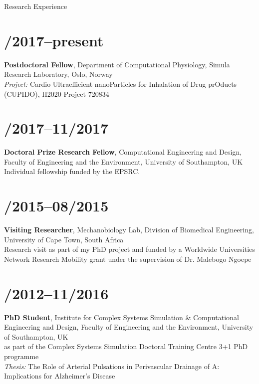 \documentclass[margin,line,10pt]{res}
\begin{document}
\begin{resume}
\vspace*{-.2in}

{\sc Research Experience}\\
\vspace*{-.35in}
\section{/2017--present}{\bf Postdoctoral Fellow}, Department of Computational Physiology, Simula Research Laboratory, Oslo, Norway\\
{\em Project:} Cardio Ultraefficient nanoParticles for Inhalation of Drug prOducts (CUPIDO), H2020 Project 720834\\
\vspace*{-.35in}
\section{/2017--11/2017}{\bf Doctoral Prize Research Fellow}, Computational Engineering and Design, Faculty of Engineering and the Environment, University of Southampton, UK\\
Individual fellowship funded by the EPSRC.\\
\vspace*{-.35in}
\section{/2015--08/2015}{\bf Visiting Researcher}, Mechanobiology Lab, Division of Biomedical Engineering, University of Cape Town, South Africa\\
Research visit as part of my PhD project and funded by a Worldwide Universities Network Research Mobility grant under the supervision of Dr. Malebogo Ngoepe\\
\vspace*{-.35in}
\section{/2012--11/2016}{\bf PhD Student}, Institute for Complex Systems Simulation \& Computational Engineering and Design, Faculty of Engineering and the Environment, University of Southampton, UK\\
as part of the Complex Systems Simulation Doctoral Training Centre 3+1 PhD programme\\
{\em Thesis:} The Role of Arterial Pulsations in Perivascular Drainage of A\textbeta: Implications for Alzheimer's Disease\\
\vspace*{-.35in}

\end{resume}
\end{document}
